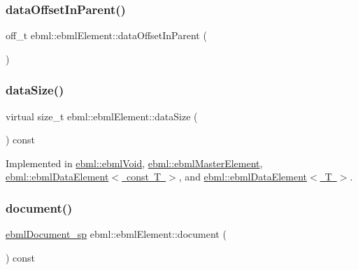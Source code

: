\subsubsection{\texorpdfstring{data\+Offset\+In\+Parent()}{dataOffsetInParent()}}
{\footnotesize\ttfamily off\+\_\+t ebml\+::ebml\+Element\+::data\+Offset\+In\+Parent (\begin{DoxyParamCaption}{ }\end{DoxyParamCaption})}

\mbox{\label{classebml_1_1ebmlElement_a47ed4167d9c69104e02b6dbad0cd1fef}} 
\subsubsection{\texorpdfstring{data\+Size()}{dataSize()}}
{\footnotesize\ttfamily virtual size\+\_\+t ebml\+::ebml\+Element\+::data\+Size (\begin{DoxyParamCaption}{ }\end{DoxyParamCaption}) const\hspace{0.3cm}{\ttfamily [pure virtual]}}



Implemented in \mbox{\hyperlink{classebml_1_1ebmlVoid_a9801f10eb9f0a5449fa39d8a31dbf315}{ebml\+::ebml\+Void}}, \mbox{\hyperlink{classebml_1_1ebmlMasterElement_ae396f9a2f9e0e86b7f6d20505b88352c}{ebml\+::ebml\+Master\+Element}}, \mbox{\hyperlink{classebml_1_1ebmlDataElement_3_01const_01T_01_4_a0965d2da67f1862d2c806151063dcfce}{ebml\+::ebml\+Data\+Element$<$ const T $>$}}, and \mbox{\hyperlink{classebml_1_1ebmlDataElement_add3cc3627008b8139a054a3a0696bc2d}{ebml\+::ebml\+Data\+Element$<$ T $>$}}.

\mbox{\label{classebml_1_1ebmlElement_a1ee44e2978cd9e23c98cd9c05dd8fa35}} 
\subsubsection{\texorpdfstring{document()}{document()}}
{\footnotesize\ttfamily \mbox{\hyperlink{namespaceebml_a66018942b568da5041136a945148b450}{ebml\+Document\+\_\+sp}} ebml\+::ebml\+Element\+::document (\begin{DoxyParamCaption}{ }\end{DoxyParamCaption}) const}

